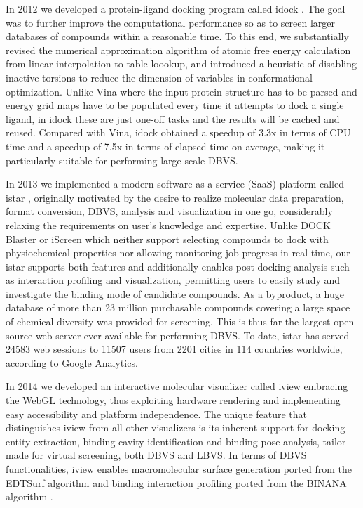 \documentclass[a4paper,12pt]{article}
\begin{document}
In 2012 we developed a protein-ligand docking program called idock \citep{1153}. The goal was to further improve the computational performance so as to screen larger databases of compounds within a reasonable time. To this end, we substantially revised the numerical approximation algorithm of atomic free energy calculation from linear interpolation to table loookup, and introduced a heuristic of disabling inactive torsions to reduce the dimension of variables in conformational optimization. Unlike Vina where the input protein structure has to be parsed and energy grid maps have to be populated every time it attempts to dock a single ligand, in idock these are just one-off tasks and the results will be cached and reused. Compared with Vina, idock obtained a speedup of 3.3x in terms of CPU time and a speedup of 7.5x in terms of elapsed time on average, making it particularly suitable for performing large-scale DBVS.

In 2013 we implemented a modern software-as-a-service (SaaS) platform called istar \citep{1362}, originally motivated by the desire to realize molecular data preparation, format conversion, DBVS, analysis and visualization in one go, considerably relaxing the requirements on user's knowledge and expertise. Unlike DOCK Blaster or iScreen which neither support selecting compounds to dock with physiochemical properties nor allowing monitoring job progress in real time, our istar supports both features and additionally enables post-docking analysis such as interaction profiling and visualization, permitting users to easily study and investigate the binding mode of candidate compounds. As a byproduct, a huge database of more than 23 million purchasable compounds covering a large space of chemical diversity was provided for screening. This is thus far the largest open source web server ever available for performing DBVS. To date, istar has served 24583 web sessions to 11507 users from 2201 cities in 114 countries worldwide, according to Google Analytics.

In 2014 we developed an interactive molecular visualizer called iview \citep{1366,1265} embracing the WebGL technology, thus exploiting hardware rendering and implementing easy accessibility and platform independence. The unique feature that distinguishes iview from all other visualizers is its inherent support for docking entity extraction, binding cavity identification and binding pose analysis, tailor-made for virtual screening, both DBVS and LBVS. In terms of DBVS functionalities, iview enables macromolecular surface generation ported from the EDTSurf algorithm \citep{1297} and binding interaction profiling ported from the BINANA algorithm \citep{1413}.
\end{document}
